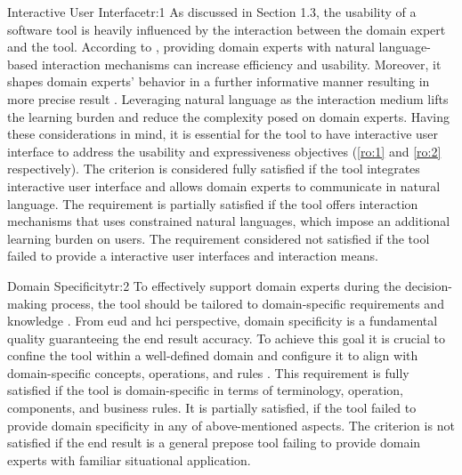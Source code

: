 \begin{thesistoolrequirement}{Interactive User Interface}{tr:1}
As discussed in Section 1.3, the usability of a software tool is heavily influenced by the interaction between the domain expert and the tool. According to \autocite{Fuckner2013}, providing domain experts with natural language-based interaction mechanisms can increase efficiency and usability. Moreover, it shapes domain experts’ behavior in a further informative manner resulting in more precise result \autocite{Zarei2020}. Leveraging natural language as the interaction medium lifts the learning burden and reduce the complexity posed on domain experts. Having these considerations in mind, it is essential for the tool to have interactive user interface to address the usability and expressiveness objectives (\cref{ro:1} and \cref{ro:2} respectively).
The criterion is considered fully satisfied if the tool integrates interactive user interface and allows domain experts to communicate in natural language. The requirement is partially satisfied if the tool offers interaction mechanisms that uses constrained natural languages, which impose an additional learning burden on users. The requirement considered not satisfied if the tool failed to provide a interactive user interfaces and interaction means.

\end{thesistoolrequirement}

\begin{thesistoolrequirement}{Domain Specificity}{tr:2}
To effectively support domain experts during the decision-making process, the tool should be tailored to domain-specific requirements and knowledge \autocite{Soi2010}. From \gls{eud} and \gls{hci} perspective, domain specificity is a fundamental quality guaranteeing the end result accuracy. To achieve this goal it is crucial to confine the tool within a well-defined domain and configure it to align with domain-specific concepts, operations, and rules \autocite{Desolda2017}.
This requirement is fully satisfied if the tool is domain-specific in terms of terminology, operation, components, and business rules. It is partially satisfied, if the tool failed to provide domain specificity in any of above-mentioned aspects. The criterion is not satisfied if the end result is a general prepose tool failing to provide domain experts with familiar situational application.

\end{thesistoolrequirement}

